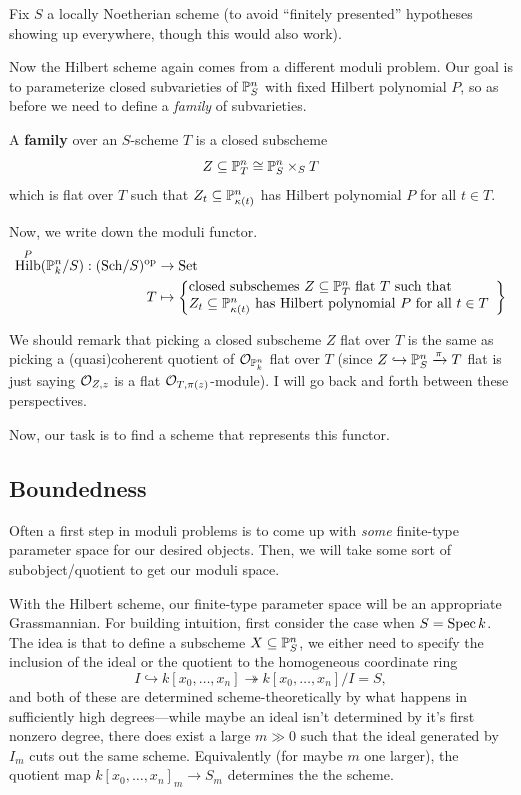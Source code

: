 \documentclass[12pt]{article}
\DeclareMathOperator{\Hilb}{Hilb}
\begin{document}
Fix $S$ a locally Noetherian scheme (to avoid ``finitely presented'' hypotheses showing up everywhere, though this would also work).

Now the Hilbert scheme again comes from a different moduli problem. Our goal is to parameterize closed subvarieties of $\P_S^n$ with fixed Hilbert polynomial $P$, so as before we need to define a \textit{family} of subvarieties.

\begin{defn}
    A \textbf{family} over an $S$-scheme $T$ is a closed subscheme
    \[Z\subseteq \P_T^n \cong \P_S^n \times_S T\]
    which is flat over $T$ such that $Z_t \subseteq \P^n_{\kappa(t)}$ has Hilbert polynomial $P$ for all $t\in T$.
\end{defn}

Now, we write down the moduli functor.
\begin{align*}
    \Hilb^P(\P_k^n/S): (\Sch/S)^\op &\to \Set\\
    T &\mapsto \left\{\parbox{22em}{closed subschemes $Z\subseteq \P_T^n$ flat $T$ such that\\ $Z_t\subseteq \P_{\kappa(t)}^n$ has Hilbert polynomial $P$ for all $t\in T$}\right\}
\end{align*}

We should remark that picking a closed subscheme $Z$ flat over $T$ is the same as picking a (quasi)coherent quotient of $\cO_{\P_k^n}$ flat over $T$ (since $Z\hookrightarrow \P_S^n \xrightarrow{\pi} T$ flat is just saying $\cO_{Z,z}$ is a flat $\cO_{T,\pi(z)}$-module). I will go back and forth between these perspectives.

Now, our task is to find a scheme that represents this functor.

\subsection{Boundedness}

Often a first step in moduli problems is to come up with \textit{some} finite-type parameter space for our desired objects. Then, we will take some sort of subobject/quotient to get our moduli space.

With the Hilbert scheme, our finite-type parameter space will be an appropriate Grassmannian. For building intuition, first consider the case when $S=\Spec k$. The idea is that to define a subscheme $X\subseteq \P_S^n$, we either need to specify the inclusion of the ideal or the quotient to the homogeneous coordinate ring
\[I \hookrightarrow k[x_0,\dots,x_n] \twoheadrightarrow k[x_0,\dots,x_n]/I = S,\]
and both of these are determined scheme-theoretically by what happens in sufficiently high degrees---while maybe an ideal isn't determined by it's first nonzero degree, there does exist a large $m\gg 0$ such that the ideal generated by $I_m$ cuts out the same scheme. Equivalently (for maybe $m$ one larger), the quotient map $k[x_0,\dots,x_n]_m \to S_m$ determines the the scheme.
\end{document}
